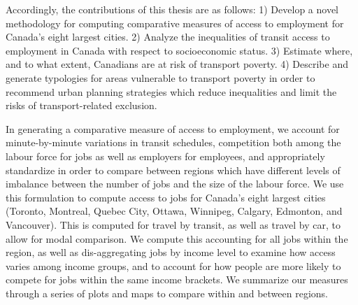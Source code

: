 \documentclass[11 pt, letterpaper]{article}
\begin{document}
{Accordingly, the contributions of this thesis are as follows: 
1) Develop a novel methodology for computing comparative measures of access to employment for Canada's eight largest cities.
2) Analyze the inequalities of transit access to employment in Canada with respect to socioeconomic status.
3) Estimate where, and to what extent, Canadians are at risk of transport poverty.
4) Describe and generate typologies for areas vulnerable to transport poverty in order to recommend urban planning strategies which reduce inequalities and limit the risks of transport-related exclusion.

In generating a comparative measure of access to employment, we account for minute-by-minute variations in transit schedules, competition both among the labour force for jobs as well as employers for employees, and appropriately standardize in order to compare between regions which have different levels of imbalance between the number of jobs and the size of the labour force. We use this formulation to compute access to jobs for Canada's eight largest cities (Toronto, Montreal, Quebec City, Ottawa, Winnipeg, Calgary, Edmonton, and Vancouver). This is computed for travel by transit, as well as travel by car, to allow for modal comparison. We compute this accounting for all jobs within the region, as well as dis-aggregating jobs by income level to examine how access varies among income groups, and to account for how people are more likely to compete for jobs within the same income brackets. We summarize our measures through a series of plots and maps to compare within and between regions.

}
\end{document}
